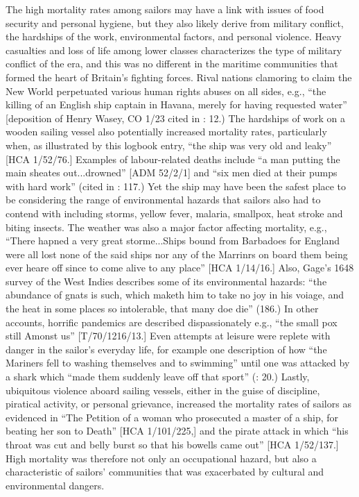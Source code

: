 The high mortality rates among sailors may have a link with issues of food security and personal hygiene, but they also likely derive from military conflict, the hardships of the work, environmental factors, and personal violence. Heavy casualties and loss of life among lower classes characterizes the type of military conflict of the era, and this was no different in the maritime communities that formed the heart of Britain’s fighting forces. Rival nations clamoring to claim the New World perpetuated various human rights abuses on all sides, e.g., “the killing of an English ship captain in Havana, merely for having requested water” [deposition of Henry Wasey, CO 1/23 cited in \citealt{Hatfield2016}: 12.) The hardships of work on a wooden sailing vessel also potentially increased mortality rates, particularly when, as illustrated by this logbook entry, “the ship was very old and leaky” [HCA 1/52/76.] Examples of labour-related deaths include “a man putting the main sheates out...drowned” [ADM 52/2/1] and “six men died at their pumps with hard work” (cited in \citealt{AdkinsAdkins2008}: 117.) Yet the ship may have been the safest place to be considering the range of environmental hazards that sailors also had to contend with including storms, yellow fever, malaria, smallpox, heat stroke and biting insects. The weather was also a major factor affecting mortality, e.g., “There hapned a very great storme...Ships bound from Barbadoes for England were all lost none of the said ships nor any of the Marrinrs on board them being ever heare off since to come alive to any place” [HCA 1/14/16.] Also, Gage’s 1648 survey of the West Indies describes some of its environmental hazards: “the abundance of gnats is such, which maketh him to take no joy in his voiage, and the heat in some places so intolerable, that many doe die” (186.) In other accounts, horrific pandemics are described dispassionately e.g., “the small pox still Amonst us” [T/70/1216/13.] Even attempts at leisure were replete with danger in the sailor’s everyday life, for example one description of how “the Mariners fell to washing themselves and to swimming” until one was attacked by a shark which “made them suddenly leave off that sport” (\citealt{Gage1648}: 20.) Lastly, ubiquitous violence aboard sailing vessels, either in the guise of discipline, piratical activity, or personal grievance, increased the mortality rates of sailors as evidenced in “The Petition of a woman who prosecuted a master of a ship, for beating her son to Death” [HCA 1/101/225,] and the pirate attack in which “his throat was cut and belly burst so that his bowells came out” [HCA 1/52/137.] High mortality was therefore not only an occupational hazard, but also a characteristic of sailors’ communities that was exacerbated by cultural and environmental dangers. 

